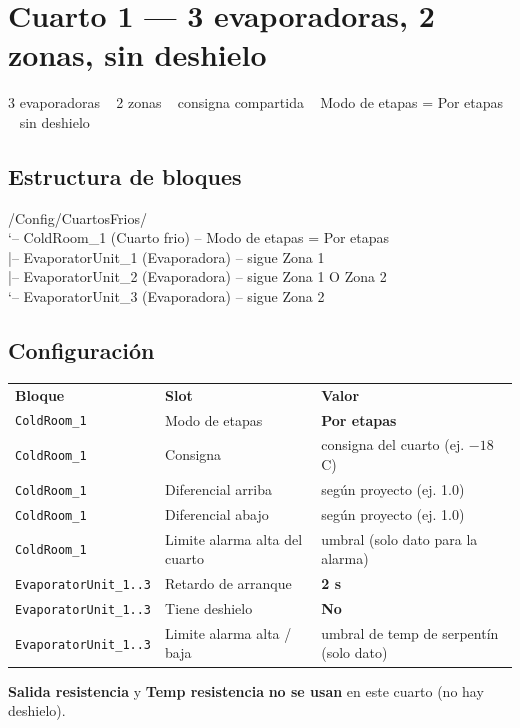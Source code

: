 \documentclass[11pt,a4paper]{article}
\newcommand{\md}{\,\textcolor{gris}{\textbullet}\,}
\newcommand{\gC}{\textdegree C}
\newcommand{\slot}[1]{\textbf{#1}}
\newcommand{\code}[1]{\texttt{#1}}
\newcommand{\cabfila}{\color{white}\bfseries}
\begin{document}
\section{Cuarto 1 — 3 evaporadoras, 2 zonas, sin deshielo}
\begin{ficha}{}3 evaporadoras \md\ 2 zonas \md\ consigna compartida \md\ Modo de etapas = Por etapas \md\ sin deshielo\end{ficha}

\subsection{Estructura de bloques}
\begin{arbol}
/Config/CuartosFrios/\\
`-- ColdRoom_1           (Cuarto frio)  -- Modo de etapas = Por etapas\\
\phantom{`-- }|-- EvaporatorUnit_1  (Evaporadora)  -- sigue Zona 1\\
\phantom{`-- }|-- EvaporatorUnit_2  (Evaporadora)  -- sigue Zona 1 O Zona 2\\
\phantom{`-- }`-- EvaporatorUnit_3  (Evaporadora)  -- sigue Zona 2
\end{arbol}

\subsection{Configuración}
\begin{center}\small
{}
\begin{tabular}{L{3.6cm} L{4.6cm} L{5.4cm}}
\cabfila \textbf{Bloque} & \cabfila \textbf{Slot} & \cabfila \textbf{Valor} \\
\code{ColdRoom_1} & Modo de etapas & \textbf{Por etapas} \\
\code{ColdRoom_1} & Consigna & consigna del cuarto (ej. \(-18\)\,\gC) \\
\code{ColdRoom_1} & Diferencial arriba & según proyecto (ej. 1.0) \\
\code{ColdRoom_1} & Diferencial abajo & según proyecto (ej. 1.0) \\
\code{ColdRoom_1} & Limite alarma alta del cuarto & umbral (solo dato para la alarma) \\
\code{EvaporatorUnit_1..3} & Retardo de arranque & \textbf{2 s} \\
\code{EvaporatorUnit_1..3} & Tiene deshielo & \textbf{No} \\
\code{EvaporatorUnit_1..3} & Limite alarma alta / baja & umbral de temp de serpentín (solo dato) \\
\end{tabular}
\end{center}
\begin{nota}\slot{Salida resistencia} y \slot{Temp resistencia} \textbf{no se usan} en este cuarto (no hay deshielo).\end{nota}
\end{document}
